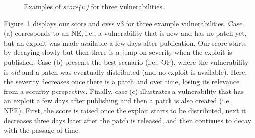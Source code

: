 \begin{figure}[t]
\caption{Examples of \emph{score(v$_i$)} for three vulnerabilities.}
\label{fig:scoreplot}
\end{figure}


Figure~\ref{fig:scoreplot} displays our score and \gls{cvss} v3 for three example vulnerabilities. 
Case (a) corresponds to an NE, i.e., a vulnerability that is new and has no patch yet, but an exploit was made available a few days after publication. 
Our score starts by decaying slowly but then there is a jump on severity when the exploit is published.
Case (b) presents the best scenario (i.e., OP), where the vulnerability is \emph{old} and a patch was eventually distributed (and no exploit is available). Here, the severity decreases once there is a patch and over time, losing its relevance from a security perspective. 
Finally, case (c) illustrates a vulnerability that has an exploit a few days after publishing and then a patch is also created (i.e., NPE).
First, the score is raised once the exploit starts to be distributed, next it decreases three days later after the patch is released, and then continues to decay with the passage of time.


